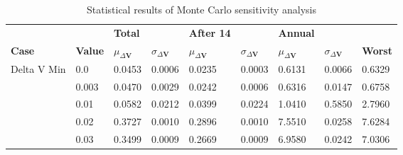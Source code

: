 \begin{table}[H]
\centering
\begin{tabular}{lllllllll}
 &  & \cellcolor[HTML]{EFEFEF}\textbf{Total} &  & \cellcolor[HTML]{EFEFEF}\textbf{After 14} & & \cellcolor[HTML]{EFEFEF}\textbf{Annual} & &\\
\rowcolor[HTML]{EFEFEF} 
\textbf{Case} & \textbf{Value} & \textbf{$\mu_{\Delta \boldsymbol{V}}$} & \textbf{$\sigma_{\Delta \boldsymbol{V}}$} & \textbf{$\mu_{\Delta \boldsymbol{V}}$} & \textbf{$\sigma_{\Delta \boldsymbol{V}}$} & \textbf{$\mu_{\Delta \boldsymbol{V}}$} & \textbf{$\sigma_{\Delta \boldsymbol{V}}$} & \textbf{Worst} \\ 
Delta V Min & 0.0 & 0.0453 & 0.0006 & 0.0235 & 0.0003 & 0.6131 & 0.0066 & 0.6329 \\ 
 & 0.003 & 0.0470 & 0.0029 & 0.0242 & 0.0006 & 0.6316 & 0.0147 & 0.6758 \\ 
 & 0.01 & 0.0582 & 0.0212 & 0.0399 & 0.0224 & 1.0410 & 0.5850 & 2.7960 \\ 
 & 0.02 & 0.3727 & 0.0010 & 0.2896 & 0.0010 & 7.5510 & 0.0258 & 7.6284 \\ 
 & 0.03 & 0.3499 & 0.0009 & 0.2669 & 0.0009 & 6.9580 & 0.0242 & 7.0306 \\ 
\end{tabular}
\caption{Statistical results of Monte Carlo sensitivity analysis}
\label{tab:SensitivityAnalysis}
\end{table}
